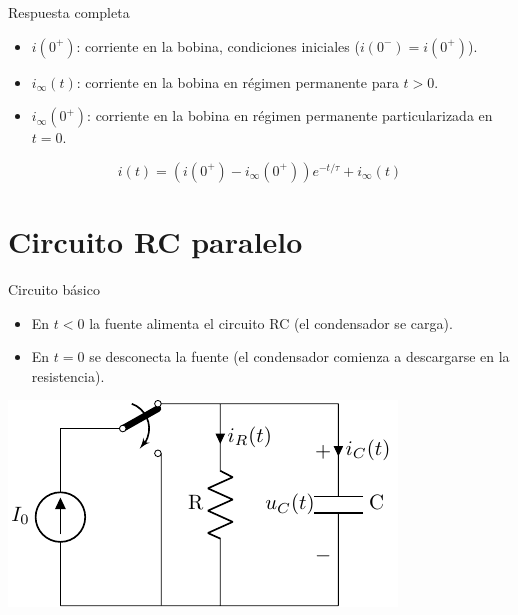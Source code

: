 \documentclass[xcolor={usenames,svgnames,dvipsnames}]{beamer}
\begin{document}
\begin{frame}[label={sec:org11046a1}]{Respuesta completa}
\begin{itemize}
\item \(i(0^+)\): corriente en la bobina, condiciones iniciales (\(i(0^-) = i(0^+)\)).
\item \(i_\infty(t)\): corriente en la bobina en régimen permanente para \(t > 0\).
\item \(i_\infty(0^+)\): corriente en la bobina en régimen permanente particularizada en \(t = 0\).
\end{itemize}

\[
i(t) = \left(i(0^+) - i_\infty(0^+)\right) e^{-t/\tau} + i_\infty(t)
\]
\end{frame}

\section{Circuito RC paralelo}
\label{sec:orgb5fbdab}

\begin{frame}[label={sec:org119a0f8}]{Circuito básico}
\begin{itemize}
\item En \(t <0\) la fuente alimenta el circuito RC (el condensador se carga).
\item En \(t = 0\) se desconecta la fuente (el condensador comienza a descargarse en la resistencia).
\end{itemize}
\begin{center}
\includegraphics[width=.9\linewidth]{../figs/transitorio_circuitoRC.pdf}
\end{center}
\end{frame}
\end{document}
